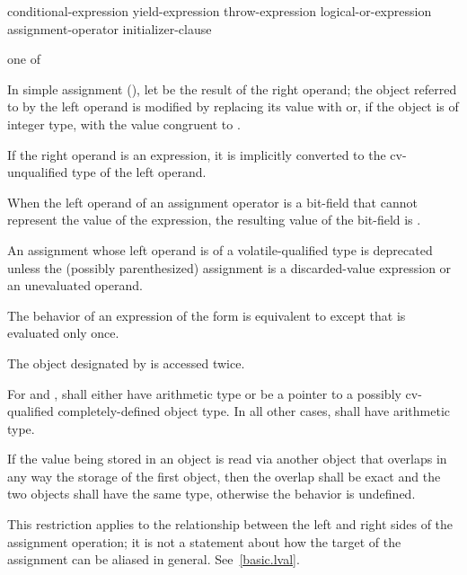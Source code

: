 \begin{bnf}
\br
    conditional-expression\br
    yield-expression\br
    throw-expression\br
    logical-or-expression assignment-operator initializer-clause
\end{bnf}

\begin{bnf}
 \textnormal{one of}\br
    \terminal{=  *=  /=  \%=   +=  -=  >>=  <<=  \&=  \caret=  |=}
\end{bnf}

\pnum
In simple assignment (\tcode{=}),
let  be the result of the right operand;
the object referred to by the left operand is
modified by replacing its value
with  or,
if the object is of integer type,
with the value congruent to .

\pnum
{}%
If the right operand is an expression, it is implicitly
converted to the cv-unqualified type of the left
operand.

\pnum
{}%
When the left operand of an assignment operator
is a bit-field that cannot represent the value of the expression, the
resulting value of the bit-field is
.

\pnum
An assignment whose left operand is of
a volatile-qualified type is deprecated
unless the (possibly parenthesized) assignment is a discarded-value expression or
an unevaluated operand.

\pnum
The behavior of an expression of the form 
is equivalent to  except
that  is evaluated only once.
\begin{note}
The object designated by  is accessed twice.
\end{note}
For \tcode{+=} and \tcode{-=},
 shall either have arithmetic type or be a pointer to a
possibly cv-qualified completely-defined object type. In all other
cases,  shall have arithmetic type.

\pnum
If the value being stored in an object is read via another object that
overlaps in any way the storage of the first object, then the overlap shall be
exact and the two objects shall have the same type, otherwise the behavior is
undefined.
\begin{note}
This restriction applies to the relationship
between the left and right sides of the assignment operation; it is not a
statement about how the target of the assignment can be aliased in general.
See~\ref{basic.lval}.
\end{note}

